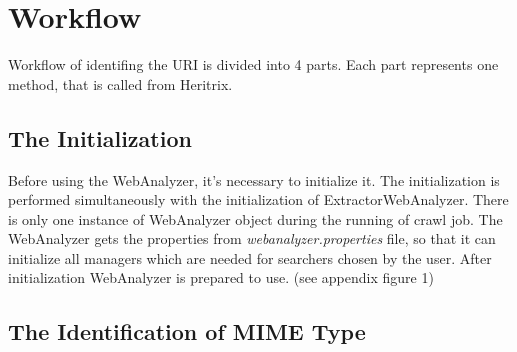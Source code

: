 \documentclass[11pt,a4paper]{article}
\begin{document}

\section{Workflow}

Workflow of identifing the URI is divided into 4 parts. Each part represents one method, that is called from Heritrix.

\subsection{The Initialization}

Before using the WebAnalyzer, it's necessary to initialize it. The i\-ni\-tia\-li\-za\-tion is performed simultaneously with the initialization of Extractor\-Web\-Analyzer. There is only one instance of WebAnalyzer object during the running of crawl job. The WebAnalyzer gets the properties from \emph{webanalyzer.properties} file, so that it can initialize all managers which are needed for searchers chosen by the user. After initialization WebAnalyzer is prepared to use. (see appendix figure 1)

\subsection{The Identification of MIME Type}
\end{document}
